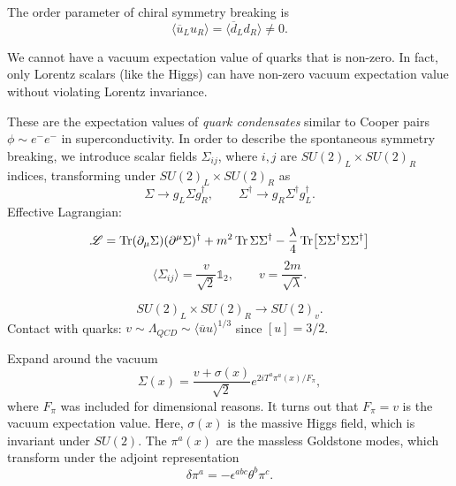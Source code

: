 The order parameter of chiral symmetry breaking is
\begin{equation}
  \langle \overline{u}{}_L u_R \rangle = \langle \overline{d}{}_L d_R \rangle \neq 0.
\end{equation}
\begin{remark}
  We cannot have a vacuum expectation value of quarks that is non-zero. In fact, only Lorentz scalars (like the Higgs) can have non-zero vacuum expectation value without violating Lorentz invariance.
\end{remark}
These are the expectation values of \emph{quark condensates} similar to Cooper pairs $\phi \sim e^- e^-$ in superconductivity.
In order to describe the spontaneous symmetry breaking, we introduce scalar fields $\Sigma_{ij}$, where $i, j$ are $SU(2)_L \times SU(2)_R$ indices, transforming under $SU(2)_L \times SU(2)_R$ as 
\begin{equation}
  \Sigma \to g_L \Sigma g_R^{\dagger}, \qquad \Sigma^{\dagger} \to g_R \Sigma^{\dagger} g_L^{\dagger}.
\end{equation}
Effective Lagrangian:
\begin{equation}
  \mathscr{L} = \Tr(\partial_{\mu} \Sigma) (\partial^{\mu} \Sigma)^{\dagger} + m^2 \Tr \Sigma \Sigma^{\dagger} - \frac{\lambda}{4} \Tr[\Sigma \Sigma^{\dagger} \Sigma \Sigma^{\dagger}]
\end{equation}
\begin{equation}
  \langle \Sigma_{ij} \rangle = \frac{v}{\sqrt{2}} \mathbb{1}_2, \qquad v = \frac{2m}{\sqrt{\lambda}}.
\end{equation}

\begin{equation}
  SU(2)_L \times SU(2)_R \to SU(2)_v.
\end{equation}
Contact with quarks: $v \sim \Lambda_{QCD} \sim \langle \overline{u}{} u \rangle^{1 / 3}$ since $[u] = 3 / 2$.

Expand around the vacuum
\begin{equation}
  \Sigma(x) = \frac{v + \sigma(x)}{\sqrt{2}} e^{2 i T^{a} \pi^{a} (x) / F_\pi},
\end{equation}
where $F_\pi$ was included for dimensional reasons. It turns out that $F_\pi = v$ is the vacuum expectation value.
Here, $\sigma(x)$ is the massive Higgs field, which is invariant under $SU(2)$.
The $\pi^{a}(x)$ are the massless Goldstone modes, which transform under the adjoint representation
\begin{equation}
  \delta \pi^{a} = -\epsilon^{abc} \theta^{b} \pi^{c}.
\end{equation}

